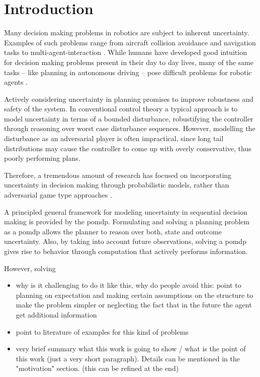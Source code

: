 \chapter{Introduction}\label{chap:introduction}

Many decision making problems in robotics are subject to inherent uncertainty.
Examples of such problems range from aircraft collision avoidance and
navigation tasks to multi-agent-interaction
\cite{kochenderfer2012next}. While humans have developed good
intuition for decision making problems present in their day to day lives, many
of the same tasks -- like planning in autonomous driving -- pose difficult
problems for robotic agents \cite{levinson2011towards}.

Actively considering uncertainty in planning promises to improve robustness and
safety of the system. In conventional control theory a typical approach is to model uncertainty in terms of a bounded
disturbance, robustifying the controller through reasoning over worst case
disturbance sequences. However, modelling the disturbance as an adversarial
player is often impractical, since long tail distributions may cause the
controller to come up with overly conservative, thus poorly performing
plans.

Therefore, a tremendous amount of research has focused on incorporating
uncertainty in decision making through probabilistic models, rather than
adversarial game type approaches \cite{roy1999coastal, amato2015planning,
fisac2018probabilistically, choudhury2019dynamic}.

 A principled
general framework for modeling uncertainty in sequential decision making is
provided by the \ac{pomdp}. Formulating and solving a planning problem as
a \ac{pomdp} allows the planner to reason over both, state and outcome
uncertainty. Also, by taking into account future observations, solving
a \ac{pomdp} gives rise to behavior through computation that actively performs
information.

However, solving

\begin{itemize}
  \item why is it challenging to do it like this, why do people avoid this:
        point to planning on expectation and making certain assumptions on the structure to
        make the problem simpler or neglecting the fact that
        in the future the agent get additional information
  \item point to literature of examples for this kind of problems
  \item very brief summary what this work is going to show / what is the point
        of this work (just a very short paragraph). Details can be mentioned in the
        "motivation" section. (this can be refined at the end)
\end{itemize}

